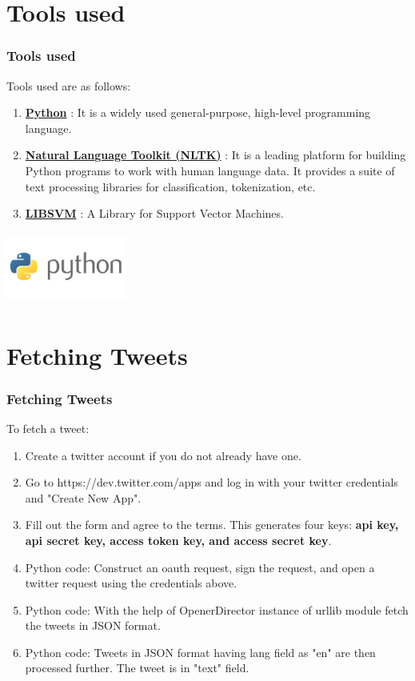 \documentclass[12pt,xcolor=dvipsnames,table,titlepage]{beamer}
\begin{document}
\section{Tools used}
\begin{frame}[t]
\frametitle{Tools used}
Tools used are as follows:
\begin{enumerate}

 \item \textbf{\underline{Python}} \cite{python}: It is a widely used general-purpose, high-level programming language.
 \item \textbf{\underline{Natural Language Toolkit (NLTK)}} \cite{nltk}: It is a leading platform for building Python programs to work with human language data. It provides a suite of text processing libraries for classification, tokenization, etc.
 \item \textbf{\underline{LIBSVM}} \cite{libsvm}: A Library for Support Vector Machines.
\end{enumerate}
\begin{center}
\includegraphics[width=150, height=90]{img2.png} 
\end{center}
\end{frame}

\section{Fetching Tweets}
\begin{frame}[t]
\frametitle{Fetching Tweets}
To fetch a tweet:
\begin{enumerate}
\item Create a twitter account if you do not already have one.
\item Go to https://dev.twitter.com/apps and log in with your twitter credentials and "Create New App".
\item Fill out the form and agree to the terms. This generates four keys: \textbf{api key, api secret key, access token key, and access secret key}.
\item Python code: Construct an oauth request, sign the request, and open a twitter request using the credentials above.
\item Python code: With the help of OpenerDirector instance of urllib module fetch the tweets in JSON format.
\item Python code: Tweets in JSON format having lang field as "en" are then processed further. The tweet is in "text" field.
\end{enumerate}
\end{frame}
\end{document}

